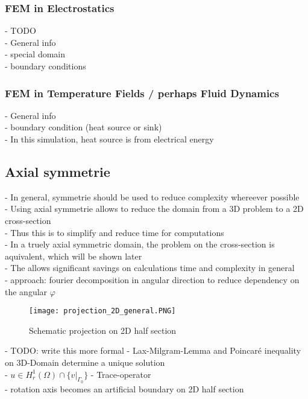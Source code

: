 \documentclass[parskip=half, titlepage=yes, 12pt, BCOR=12mm, DIV=calc]{scrartcl}
\begin{document}
\subsubsection{FEM in Electrostatics}
- TODO \\
- General info \\
- special domain \\
- boundary conditions \\

\subsubsection{FEM in Temperature Fields / perhaps Fluid Dynamics}
- General info \\
- boundary condition (heat source or sink) \\
- In this simulation, heat source is from electrical energy \\


\subsection{Axial symmetrie}
- In general, symmetrie should be used to reduce complexity whereever possible \\
- Using axial symmetrie allows to reduce the domain from a 3D problem to a 2D cross-section \\
- Thus this is to simplify and reduce time for computations \\
- In a truely axial symmetric domain, the problem on the cross-section is aquivalent, which will be shown later \\
- The allows significant savings on calculations time and complexity in general \\
- approach: fourier decomposition in angular direction to reduce dependency on the angular $\varphi$ \\

\begin{figure}[H]
    \centering
    \texttt{[image: projection\_2D\_general.PNG]}
    \caption{Schematic projection on 2D half section}
    \label{projection_2D_general}
\end{figure}


- TODO: write this more formal
- Lax-Milgram-Lemma and Poincaré inequality on 3D-Domain determine a unique solution \\
- $u \in H^{1}_{r}(\Omega) \cap \{ v|_{\Gamma_{0}} \}  $
- Trace-operator \\
- rotation axis becomes an artificial boundary on 2D half section \\
\end{document}
